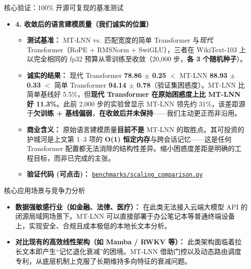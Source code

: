 ﻿\documentclass[aspectratio=169, 10pt]{beamer}
\begin{document}
\begin{frame}[allowframebreaks]{核心验证：100\% 开源可复现的基准测试}
\begin{itemize}
    \begin{itemize}
        \item \textbf{测试基准：} 严格禁用一切 GPU 显卡，仅以最劣势的纯 CPU 运行。
        \item \textbf{商业意义：} 机器靠“仿生睡眠”主动跳过绝对的无效计算，推理速度直接 \textbf{逆势提升了 13\%+}。这意味着未来企业在铺设几十万台本地智能设备时，可以彻底省去购买昂贵 AI 加速卡的绝大部分天价成本。
        \item \textbf{验证代码 (可点击)：} \href{https://github.com/everest-an/M1/blob/main/benchmarks/sparse_resonance_ablation.py}{\texttt{benchmarks/sparse\_resonance\_ablation.py}}
    \end{itemize}
    \vspace{0.4em}
    \item \textbf{4. 收敛后的语言建模质量（我们诚实的位置）}
    \begin{itemize}
        \item \textbf{测试基准：} MT-LNN vs.\ 匹配宽度的简单 Transformer 与\emph{现代} Transformer（RoPE + RMSNorm + SwiGLU），三者在 WikiText-103 上以完全相同的 fp32 预算从零训练至收敛（20,000 步，\textbf{各 3 个随机种子}）。
        \item \textbf{诚实的结果：} 现代 Transformer \textbf{78.86 $\pm$ 0.25} $<$ MT-LNN \textbf{88.93 $\pm$ 0.33} $<$ 简单 Transformer \textbf{94.14 $\pm$ 0.78}（验证集困惑度）。MT-LNN 比简单基线好 5.5\%，但\textbf{现代 Transformer 在原始困惑度上比 MT-LNN 好 11.3\%}。此前 2,000 步的实验曾显示 MT-LNN 领先约 31\%，该差距源于\textbf{欠训练 + 基线偏弱}，\textbf{在收敛后并未保持}——我们主动更正而非沿用。
        \item \textbf{商业含义：} 原始语言建模质量\textbf{目前不是} MT-LNN 的取胜点。其可投资的护城河是上文第 1--3 项的 \textbf{O(1) 恒定内存}与跨会话记忆——这是任何 Transformer 配置都无法消除的结构性差异。缩小困惑度差距是明确的工程目标，而非已完成的主张。
        \item \textbf{验证代码 (可点击)：} \href{https://github.com/everest-an/M1/blob/main/benchmarks/scaling_comparison.py}{\texttt{benchmarks/scaling\_comparison.py}}
    \end{itemize}
\end{itemize}
\end{frame}

\begin{frame}{核心应用场景与竞争力分析}
\begin{itemize}
    \item \textbf{数据强敏感行业（如金融、法律、医疗）：} 
        在此类无法接入云端大模型 API 的闭源局域网场景下。MT-LNN 可以直接部署于办公笔记本等普通终端设备上，实现安全、合规且成本极低的本地长文本分析。
    \item \textbf{对比现有的高效线性架构（如 Mamba / RWKV 等）：}
        此类架构面临着拉长文本即产生“记忆退化衰减”的困境。MT-LNN 借助门控以及动态路由调度专利，从底层机制上克服了长期维持多向特征的衰减问题。
\end{itemize}
\end{frame}
\end{document}
